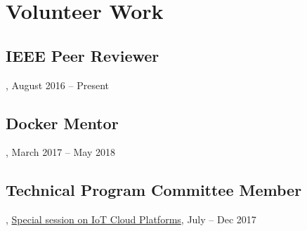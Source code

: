 \section{Volunteer Work}
\subsection{IEEE Peer Reviewer}, August 2016 -- Present
\subsection{Docker Mentor}, March 2017 -- May 2018
\subsection{Technical Program Committee Member}, \href{https://computing.derby.ac.uk/c/special-session-on-iot-cloud-platforms}{Special session on IoT Cloud Platforms}, July -- Dec 2017
